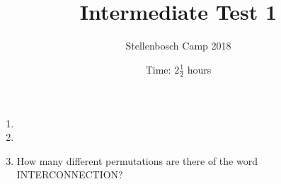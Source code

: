 \documentclass{article}
\title{Intermediate Test 1}
\author{Stellenbosch Camp 2018}
\date{Time: $2\frac{1}{2}$ hours}
\begin{document}
\maketitle

\begin{enumerate}[1.]

\item %


\item %


\item %
How many different permutations are there of the word INTERCONNECTION?

\end{enumerate}
\end{document}
